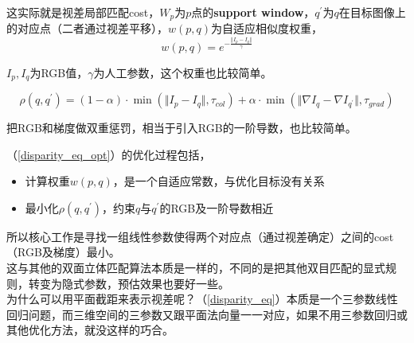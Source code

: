 这实际就是视差局部匹配cost，$W_p$为$p$点的\textbf{support window}，$q^\prime$为$q$在目标图像上的对应点（二者通过视差平移），$w(p,q)$为自适应相似度权重，
$$
	w(p,q) = e^{-\frac{\Vert I_p - I_q\Vert}{\gamma}}
$$

$I_p,I_q$为RGB值，$\gamma$为人工参数，这个权重也比较简单。

$$
	\rho(q,q^\prime) = (1-\alpha)\cdot \min\left(\Vert I_p - I_q\Vert, \tau_{col}\right) + \alpha\cdot\min\left(\Vert\nabla I_q - \nabla I_{q^\prime} \Vert, \tau_{grad}\right)
$$

把RGB和梯度做双重惩罚，相当于引入RGB的一阶导数，也比较简单。

（\ref{disparity_eq_opt}）的优化过程包括，

\begin{itemize}
	\item 计算权重$w(p,q)$，是一个自适应常数，与优化目标没有关系
	\item 最小化$\rho(q,q^\prime)$，约束$q$与$q^\prime$的RGB及一阶导数相近
\end{itemize}

所以核心工作是寻找一组线性参数使得两个对应点（通过视差确定）之间的cost（RGB及梯度）最小。\\

这与其他的双面立体匹配算法本质是一样的，不同的是把其他双目匹配的显式规则，转变为隐式参数，预估效果也要好一些。\\

为什么可以用平面截距来表示视差呢？（\ref{disparity_eq}）本质是一个三参数线性回归问题，而三维空间的三参数又跟平面法向量一一对应，如果不用三参数回归或其他优化方法，就没这样的巧合。

